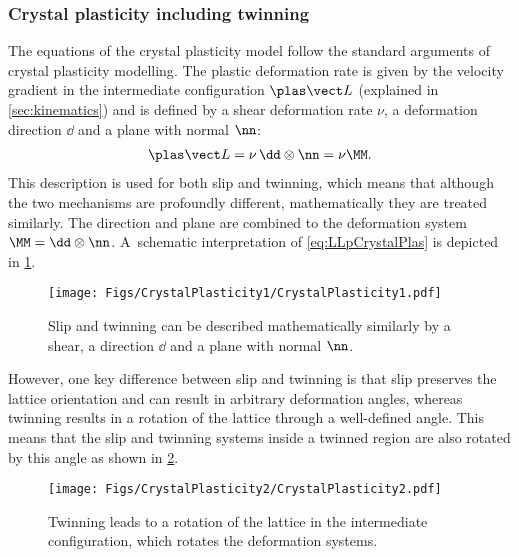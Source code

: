 \subsubsection{Crystal plasticity including twinning}
The equations of the crystal plasticity model follow the standard arguments of crystal plasticity modelling\supercite{roters_crystal_2010}. The plastic deformation rate is given by the velocity gradient in the intermediate configuration $\LLp$ (explained in \cref{sec:kinematics}) and is defined by a shear deformation rate $\nu$, a deformation direction $\dd$ and a plane with normal $\nn$:
\begin{align}
  \LLp = \nu \, \dd\otimes\nn = \nu\MM.
  \label{eq:LLpCrystalPlas}
\end{align}
This description is used for both slip and twinning, which means that although the two mechanisms are profoundly different, mathematically they are treated similarly. The direction and plane are combined to the deformation system \mbox{$\MM=\dd\otimes\nn$}. A~schematic interpretation of \cref{eq:LLpCrystalPlas} is depicted in \cref{fig:CrystalPlasticity1}. \\
\begin{figure}[H]
  \centering
  \texttt{[image: Figs/CrystalPlasticity1/CrystalPlasticity1.pdf]}
  \caption{Slip and twinning can be described mathematically similarly by a shear, a direction $\dd$ and a plane with normal $\nn$.}
  \label{fig:CrystalPlasticity1}
\end{figure}

However, one key difference between slip and twinning is that slip preserves the lattice orientation and can result in arbitrary deformation angles, whereas twinning results in a rotation of the lattice through a well-defined angle. This means that the slip and twinning systems inside a twinned region are also rotated by this angle as shown in \cref{fig:CrystalPlasticity2}. \\
\begin{figure}[h!]
  \centering
  \texttt{[image: Figs/CrystalPlasticity2/CrystalPlasticity2.pdf]}
  \caption{Twinning leads to a rotation of the lattice in the intermediate configuration, which rotates the deformation systems.}
  \label{fig:CrystalPlasticity2}
\end{figure}

